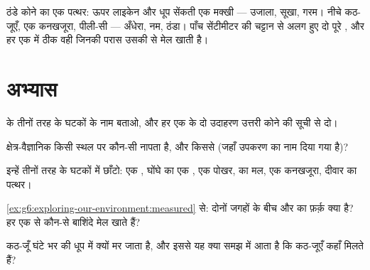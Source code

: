 \begin{example}[पत्थर, ऊपर और नीचे]\label{ex:g6:exploring-our-environment:stone}
ठंडे कोने का एक पत्थर: ऊपर लाइकेन और धूप सेंकती एक मक्खी --- उजाला,
सूखा, गरम। नीचे कठ-जूएँ, एक कनखजूरा, पीली-सी  --- अँधेरा, नम, ठंडा।
पाँच सेंटीमीटर की चट्टान से अलग हुए दो पूरे , और हर एक में
ठीक वही  जिनकी परास उसकी  से मेल खाती है।
\end{example}

\section{अभ्यास}

\begin{exercise}[$\star$]\label{exo:g6:exploring-our-environment:1}
 के तीनों तरह के घटकों के नाम बताओ, और हर एक के दो उदाहरण
उत्तरी कोने की सूची से दो।
\end{exercise}

\begin{exercise}[$\star$]\label{exo:g6:exploring-our-environment:2}
क्षेत्र-वैज्ञानिक किसी स्थल पर कौन-सी  नापता है, और किससे
(जहाँ उपकरण का नाम दिया गया है)?
\end{exercise}

\begin{exercise}[$\star$]\label{exo:g6:exploring-our-environment:3}
इन्हें तीनों तरह के घटकों में छाँटो: एक , घोंघे का एक , एक
पोखर,  का मल, एक कनखजूरा, दीवार का पत्थर।
\end{exercise}

\begin{exercise}[$\star$]\label{exo:g6:exploring-our-environment:4}
\cref{ex:g6:exploring-our-environment:measured} से: दोनों जगहों के बीच
 और  का फ़र्क़ क्या है? हर एक से कौन-से बाशिंदे मेल खाते हैं?
\end{exercise}

\begin{exercise}[$\star$]\label{exo:g6:exploring-our-environment:5}
कठ-जूँ घंटे भर की धूप में क्यों मर जाता है, और इससे यह क्या समझ में आता
है कि कठ-जूएँ कहाँ मिलते हैं?
\end{exercise}

